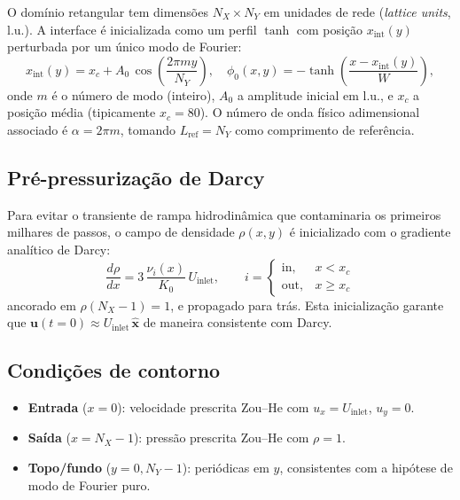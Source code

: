 \documentclass[11pt,a4paper]{article}
\newcommand{\Lref}{L_{\mathrm{ref}}}
\begin{document}
O domínio retangular tem dimensões $N_X \times N_Y$ em unidades de rede
(\textit{lattice units}, l.u.). A interface é inicializada como um perfil
$\tanh$ com posição $x_{\mathrm{int}}(y)$ perturbada por um único modo de
Fourier:
\begin{equation}
    x_{\mathrm{int}}(y) = x_c + A_0\,\cos\!\left(\frac{2\pi m y}{N_Y}\right),
    \quad
    \phi_0(x,y) = -\tanh\!\left( \frac{x - x_{\mathrm{int}}(y)}{W} \right),
    \label{eq:phi0}
\end{equation}
onde $m$ é o número de modo (inteiro), $A_0$ a amplitude inicial em l.u., e
$x_c$ a posição média (tipicamente $x_c = 80$). O número de onda físico
adimensional associado é $\alpha = 2\pi m$, tomando $\Lref = N_Y$ como
comprimento de referência.

\subsection{Pré-pressurização de Darcy}

Para evitar o transiente de rampa hidrodinâmica que contaminaria os
primeiros milhares de passos, o campo de densidade $\rho(x,y)$ é
inicializado com o gradiente analítico de Darcy:
\begin{equation}
    \frac{d\rho}{dx} = 3\,\frac{\nu_i(x)}{K_0}\,U_{\mathrm{inlet}},
    \qquad
    i = \begin{cases} \mathrm{in},  & x < x_c \\ \mathrm{out}, & x \geq x_c\end{cases}
\end{equation}
ancorado em $\rho(N_X-1) = 1$, e propagado para trás. Esta inicialização
garante que $\mathbf{u}(t=0) \approx U_{\mathrm{inlet}}\,\hat{\mathbf{x}}$
de maneira consistente com Darcy.

\subsection{Condições de contorno}

\begin{itemize}
    \item \textbf{Entrada} ($x=0$): velocidade prescrita Zou--He com
    $u_x = U_{\mathrm{inlet}}$, $u_y = 0$.
    \item \textbf{Saída} ($x=N_X-1$): pressão prescrita Zou--He com $\rho = 1$.
    \item \textbf{Topo/fundo} ($y=0, N_Y-1$): periódicas em $y$, consistentes
    com a hipótese de modo de Fourier puro.
\end{itemize}
\end{document}
